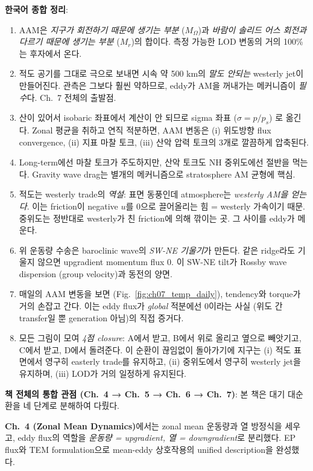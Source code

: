\begin{hisublock}
\textbf{한국어 종합 정리}:
\begin{enumerate}
  \item AAM은 \emph{지구가 회전하기 때문에 생기는 부분} ($M_\Omega$)과
    \emph{바람이 솔리드 어스 회전과 다르기 때문에 생기는 부분} ($M_r$)의 합이다.
    측정 가능한 LOD 변동의 거의 100\%는 후자에서 온다.
  \item 적도 공기를 그대로 극으로 보내면 시속 약 500 km의 \emph{말도 안되는}
    westerly jet이 만들어진다.  관측은 그보다 훨씬 약하므로, eddy가 AM을
    꺼내가는 메커니즘이 \emph{필수}다.  Ch.~7 전체의 출발점.
  \item 산이 있어서 isobaric 좌표에서 계산이 안 되므로 sigma 좌표 ($\sigma = p/p_s$)
    로 옮긴다.  Zonal 평균을 취하고 연직 적분하면, AAM 변동은 (i) 위도방향
    flux convergence, (ii) 지표 마찰 토크, (iii) 산악 압력 토크의 3개로 깔끔하게
    압축된다.
  \item Long-term에선 마찰 토크가 주도하지만, 산악 토크도 NH 중위도에선 절반을
    먹는다.  Gravity wave drag는 별개의 메커니즘으로 stratosphere AM 균형에
    핵심.
  \item 적도는 westerly trade의 \emph{역설}: 표면 동풍인데 atmosphere는
    \emph{westerly AM을 얻는다}.  이는 friction이 negative $u$를 0으로 끌어올리는
    힘 = westerly 가속이기 때문.  중위도는 정반대로 westerly가 친 friction에
    의해 깎이는 곳.  그 사이를 eddy가 메운다.
  \item 위 운동량 수송은 baroclinic wave의 \emph{SW-NE 기울기}가 만든다.
    같은 ridge라도 기울지 않으면 upgradient momentum flux 0.  이 SW-NE tilt가
    Rossby wave dispersion (group velocity)과 동전의 양면.
  \item 매일의 AAM 변동을 보면 (Fig.~\ref{fig:ch07_temp_daily}), tendency와
    torque가 거의 손잡고 간다.  이는 eddy flux가 \emph{global} 적분에선 0이라는
    사실 (위도 간 transfer일 뿐 generation 아님)의 직접 증거다.
  \item 모든 그림이 모여 \emph{4점 closure}: A에서 받고, B에서 위로 올리고
    옆으로 빼앗기고, C에서 받고, D에서 돌려준다.  이 순환이 끊임없이 돌아가기에
    지구는 (i) 적도 표면에서 영구히 easterly trade를 유지하고, (ii) 중위도에서
    영구히 westerly jet을 유지하며, (iii) LOD가 거의 일정하게 유지된다.
\end{enumerate}

\medskip
\textbf{책 전체의 통합 관점 (Ch.~4 → Ch.~5 → Ch.~6 → Ch.~7)}: 본 책은 대기
대순환을 네 단계로 분해하여 다뤘다.

\textbf{Ch.~4 (Zonal Mean Dynamics)}에서는 zonal mean 운동량과 열 방정식을
세우고, eddy flux의 역할을 \emph{운동량 = upgradient, 열 = downgradient}로
분리했다.  EP flux와 TEM formulation으로 mean-eddy 상호작용의 unified
description을 완성했다.


\end{hisublock}
